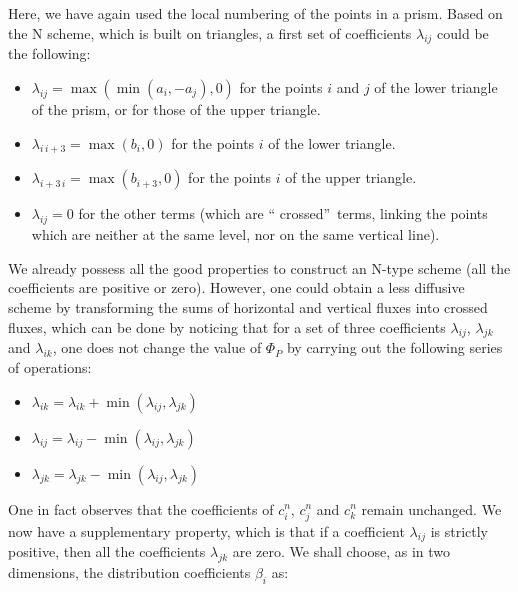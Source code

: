 Here, we have again used the local numbering of the points in a prism.
Based on the N scheme, which is built on triangles, a first set of
coefficients $\lambda_{ij}$ could be the following:

\begin{itemize}
\item $\lambda_{ij}=\max(\min(a_{i},-a_{j}),0)$ for the points $i$ and $j$ of
the lower triangle of the prism, or for those of the upper triangle.

\item $\lambda_{i\,i+3}=\max(b_{i},0)$ for the points $i$ of the lower triangle.

\item $\lambda_{i+3\,i}=\max(b_{i+3},0)$ for the points $i$ of the upper triangle.

\item $\lambda_{ij}=0$ for the other terms (which are \textquotedblleft
crossed\textquotedblright\ terms, linking the points which are neither at the
same level, nor on the same vertical line).
\end{itemize}

We already possess all the good properties to construct an N-type scheme (all
the coefficients are positive or zero). However, one could obtain a less
diffusive scheme by transforming the sums of horizontal and vertical fluxes
into crossed fluxes, which can be done by noticing that for a set of three
coefficients $\lambda_{ij}$, $\lambda_{jk}$ and $\lambda_{ik}$, one does not
change the value of $\Phi_{P}$ by carrying out the following series of operations:

\begin{itemize}
\item $\lambda_{ik}=\lambda_{ik}+\min(\lambda_{ij},\lambda_{jk})$

\item $\lambda_{ij}=\lambda_{ij}-\min(\lambda_{ij},\lambda_{jk})$

\item $\lambda_{jk}=\lambda_{jk}-\min(\lambda_{ij},\lambda_{jk})$
\end{itemize}

One in fact observes that the coefficients of $c_{i}^{n}$, $c_{j}^{n}$ and
$c_{k}^{n}$ remain unchanged. We now have a supplementary property, which is
that if a coefficient $\lambda_{ij}$ is strictly positive, then all the
coefficients $\lambda_{jk}$ are zero.
We shall choose, as in two dimensions, the distribution coefficients
$\beta_{i}$ as:%

